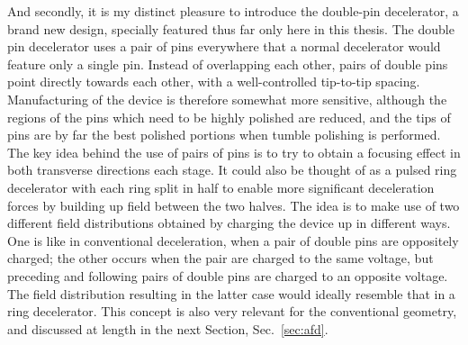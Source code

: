 
And secondly, it is my distinct pleasure to introduce the double-pin decelerator, a brand new design, specially featured thus far only here in this thesis.
The double pin decelerator uses a pair of pins everywhere that a normal decelerator would feature only a single pin.
Instead of overlapping each other, pairs of double pins point directly towards each other, with a well-controlled tip-to-tip spacing.
Manufacturing of the device is therefore somewhat more sensitive, although the regions of the pins which need to be highly polished are reduced, and the tips of pins are by far the best polished portions when tumble polishing is performed.
The key idea behind the use of pairs of pins is to try to obtain a focusing effect in both transverse directions each stage.
It could also be thought of as a pulsed ring decelerator with each ring split in half to enable more significant deceleration forces by building up field between the two halves.
The idea is to make use of two different field distributions obtained by charging the device up in different ways.
One is like in conventional deceleration, when a pair of double pins are oppositely charged; the other occurs when the pair are charged to the same voltage, but preceding and following pairs of double pins are charged to an opposite voltage.
The field distribution resulting in the latter case would ideally resemble that in a ring decelerator. 
This concept is also very relevant for the conventional geometry, and discussed at length in the next Section, Sec.~\ref{sec:afd}.


